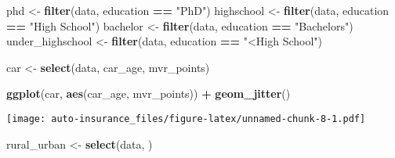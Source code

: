 \documentclass[]{article}
\newenvironment{Shaded}{\begin{snugshade}}{\end{snugshade}}
\newcommand{\KeywordTok}[1]{\textcolor[rgb]{0.13,0.29,0.53}{\textbf{#1}}}
\newcommand{\DataTypeTok}[1]{\textcolor[rgb]{0.13,0.29,0.53}{#1}}
\newcommand{\StringTok}[1]{\textcolor[rgb]{0.31,0.60,0.02}{#1}}
\newcommand{\OperatorTok}[1]{\textcolor[rgb]{0.81,0.36,0.00}{\textbf{#1}}}
\newcommand{\NormalTok}[1]{#1}
\begin{document}
\begin{Shaded}
\begin{Highlighting}[]
\NormalTok{phd <-}\StringTok{ }\KeywordTok{filter}\NormalTok{(data, education }\OperatorTok{==}\StringTok{ "PhD"}\NormalTok{)}
\NormalTok{highschool <-}\StringTok{ }\KeywordTok{filter}\NormalTok{(data, education }\OperatorTok{==}\StringTok{ "High School"}\NormalTok{)}
\NormalTok{bachelor  <-}\StringTok{ }\KeywordTok{filter}\NormalTok{(data, education }\OperatorTok{==}\StringTok{ "Bachelors"}\NormalTok{)}
\NormalTok{under_highschool <-}\StringTok{ }\KeywordTok{filter}\NormalTok{(data, education }\OperatorTok{==}\StringTok{ "<High School"}\NormalTok{)}
\end{Highlighting}
\end{Shaded}

\begin{Shaded}
\end{Shaded}

\begin{Shaded}
\begin{Highlighting}[]
\NormalTok{car <-}\StringTok{ }\KeywordTok{select}\NormalTok{(data, car_age, mvr_points)}

\KeywordTok{ggplot}\NormalTok{(car, }\KeywordTok{aes}\NormalTok{(car_age, mvr_points)) }\OperatorTok{+}\StringTok{ }\KeywordTok{geom_jitter}\NormalTok{()}
\end{Highlighting}
\end{Shaded}

\texttt{[image: auto-insurance\_files/figure-latex/unnamed-chunk-8-1.pdf]}

\begin{Shaded}
\begin{Highlighting}[]
\NormalTok{rural_urban <-}\StringTok{ }
\StringTok{  }\KeywordTok{select}\NormalTok{(data, )}
\end{Highlighting}
\end{Shaded}
\end{document}
